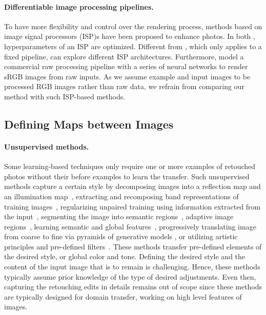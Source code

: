 \paragraph{Differentiable image processing pipelines.}
To have more flexibility and control over the rendering process, methods based on image signal processors (ISP)s have been proposed to enhance photos. In both \cite{tseng2019hyperparameter, yu2021reconfigisp}, hyperparameters of an ISP are optimized. Different from \cite{tseng2019hyperparameter}, which only applies to a fixed pipeline, \citeauthor{yu2021reconfigisp} \cite{yu2021reconfigisp} can explore different ISP architectures. Furthermore, \citeauthor{tseng2022neural} \cite{tseng2022neural} model a commercial raw processing pipeline with a series of neural networks to render sRGB images from raw inputs. As we assume example and input images to be processed RGB images rather than raw data, we refrain from comparing our method with such ISP-based methods.


\subsection{Defining Maps between Images}

\paragraph{Unsupervised methods.} Some learning-based techniques only require one or more examples of retouched photos without their before examples to learn the transfer. Such unsupervised methods capture a certain style by decomposing images into a reflection map and an illumination map~\cite{ma2021retinexgan},
extracting and recomposing band representations of training images~\cite{yang2020fidelity}, regularizing  unpaired training using information extracted from the input~\cite{9334429}, segmenting the image into semantic regions~\cite{Liu16Makeup}, adaptive image regions~\cite{Frigo16Split}, learning semantic and global features~\cite{Chen18Deep}, progressively translating
image from coarse to fine via pyramids of generative models \cite{lin2020tuigan}, or utilizing artistic principles and pre-defined filters~\cite{Zhang13Style,Hu18Exposure}. These methods transfer pre-defined elements of the desired style, or global color and tone. Defining the desired style and the content of the input image that is to remain is challenging. Hence, these methods typically assume prior knowledge of the type of desired adjustments. Even then, capturing the retouching edits in details remains out of scope since these methods are typically designed for domain transfer, working on high level features of images. %

